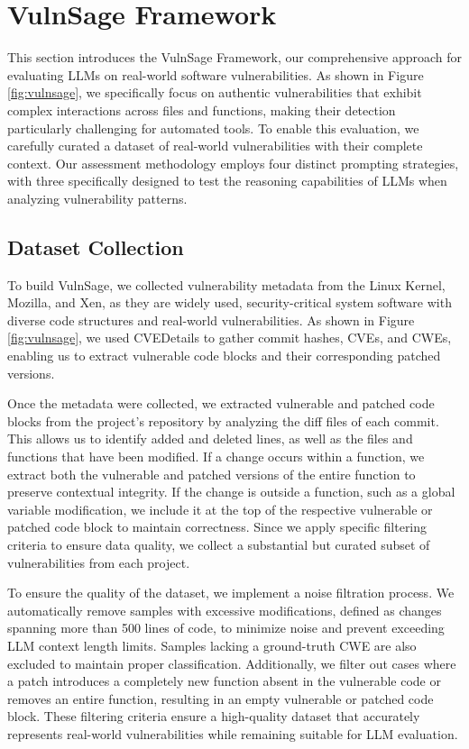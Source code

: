 \documentclass[sigconf]{acmart}
\begin{document}
\section{VulnSage Framework}
\label{section: Experimental Setup}
This section introduces the VulnSage Framework, our comprehensive approach for evaluating LLMs on real-world software vulnerabilities. As shown in Figure \ref{fig:vulnsage}, we specifically focus on authentic vulnerabilities that exhibit complex interactions across files and functions, making their detection particularly challenging for automated tools. To enable this evaluation, we carefully curated a dataset of real-world vulnerabilities with their complete context. Our assessment methodology employs four distinct prompting strategies, with three specifically designed to test the reasoning capabilities of LLMs when analyzing vulnerability patterns.

\subsection{Dataset Collection}
\label{subsection:dataset}
To build VulnSage, we collected vulnerability metadata from the Linux Kernel, Mozilla, and Xen, as they are widely used, security-critical system software with diverse code structures and real-world vulnerabilities. As shown in Figure~ \ref{fig:vulnsage}, we used CVEDetails \cite{cvedetails} to gather commit hashes, CVEs, and CWEs, enabling us to extract vulnerable code blocks and their corresponding patched versions.

Once the metadata were collected, we extracted vulnerable and patched code blocks from the project's repository by analyzing the diff files of each commit. This allows us to identify added and deleted lines, as well as the files and functions that have been modified. If a change occurs within a function, we extract both the vulnerable and patched versions of the entire function to preserve contextual integrity. If the change is outside a function, such as a global variable modification, we include it at the top of the respective vulnerable or patched code block to maintain correctness. Since we apply specific filtering criteria to ensure data quality, we collect a substantial but curated subset of vulnerabilities from each project.

To ensure the quality of the dataset, we implement a noise filtration process. We automatically remove samples with excessive modifications, defined as changes spanning more than 500 lines of code, to minimize noise and prevent exceeding LLM context length limits. Samples lacking a ground-truth CWE are also excluded to maintain proper classification. Additionally, we filter out cases where a patch introduces a completely new function absent in the vulnerable code or removes an entire function, resulting in an empty vulnerable or patched code block. These filtering criteria ensure a high-quality dataset that accurately represents real-world vulnerabilities while remaining suitable for LLM evaluation.
\end{document}
